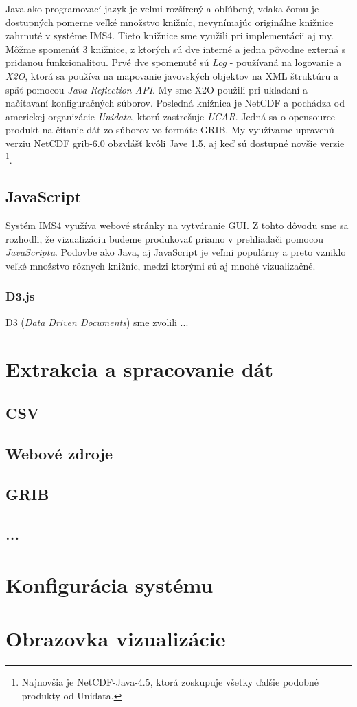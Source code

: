 Java ako programovací jazyk je veľmi rozšírený a obľúbený, vďaka čomu je dostupných pomerne veľké množstvo knižníc, nevynímajúc originálne knižnice zahrnuté v systéme IMS4. Tieto knižnice sme využili pri implementácii aj my. Môžme spomenúť 3 knižnice, z ktorých sú dve interné a jedna pôvodne externá s pridanou funkcionalitou. Prvé dve spomenuté sú \textit{Log} - používaná na logovanie a \textit{X2O}, ktorá sa používa na mapovanie javovských objektov na XML štruktúru a späť pomocou \textit{Java Reflection API}. My sme X2O použili pri ukladaní a načítavaní konfiguračných súborov. Posledná knižnica je NetCDF a pochádza od americkej organizácie \textit{Unidata}, ktorú zastrešuje \textit{UCAR}. Jedná sa o opensource produkt na čítanie dát zo súborov vo formáte GRIB. My využívame upravenú verziu NetCDF grib-6.0 obzvlášť kvôli Jave 1.5, aj keď sú dostupné novšie verzie \footnote{Najnovšia je NetCDF-Java-4.5, ktorá zoskupuje všetky ďalšie podobné produkty od Unidata.}.

\subsection{JavaScript}
Systém IMS4 využíva webové stránky na vytváranie GUI. Z tohto dôvodu sme sa rozhodli, že vizualizáciu budeme produkovať priamo v prehliadači pomocou \textit{JavaScriptu}. Podovbe ako Java, aj JavaScript je veľmi populárny a preto vzniklo veľké množstvo rôznych knižníc, medzi ktorými sú aj mnohé vizualizačné.

\subsubsection{D3.js}
D3 (\textit{Data Driven Documents}) sme zvolili ...


\section{Extrakcia a spracovanie dát}

\subsection{CSV}

\subsection{Webové zdroje}

\subsection{GRIB}

\subsection{...}

\section{Konfigurácia systému}


\section{Obrazovka vizualizácie}